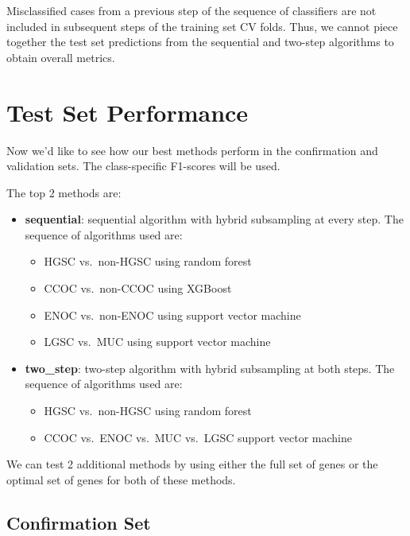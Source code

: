 \documentclass[
]{report}
\providecommand{\tightlist}{%
  \setlength{\itemsep}{0pt}\setlength{\parskip}{0pt}}
\begin{document}
Misclassified cases from a previous step of the sequence of classifiers are not included in subsequent steps of the training set CV folds. Thus, we cannot piece together the test set predictions from the sequential and two-step algorithms to obtain overall metrics.

\hypertarget{test-set-performance}{%
\section{Test Set Performance}\label{test-set-performance}}

Now we'd like to see how our best methods perform in the confirmation and validation sets. The class-specific F1-scores will be used.

The top 2 methods are:

\begin{itemize}
\tightlist
\item
  \textbf{sequential}: sequential algorithm with hybrid subsampling at every step. The sequence of algorithms used are:

  \begin{itemize}
  \tightlist
  \item
    HGSC vs.~non-HGSC using random forest
  \item
    CCOC vs.~non-CCOC using XGBoost
  \item
    ENOC vs.~non-ENOC using support vector machine
  \item
    LGSC vs.~MUC using support vector machine
  \end{itemize}
\item
  \textbf{two\_step}: two-step algorithm with hybrid subsampling at both steps. The sequence of algorithms used are:

  \begin{itemize}
  \tightlist
  \item
    HGSC vs.~non-HGSC using random forest
  \item
    CCOC vs.~ENOC vs.~MUC vs.~LGSC support vector machine
  \end{itemize}
\end{itemize}

We can test 2 additional methods by using either the full set of genes or the optimal set of genes for both of these methods.

\hypertarget{confirmation-set}{%
\subsection{Confirmation Set}\label{confirmation-set}}
\end{document}

